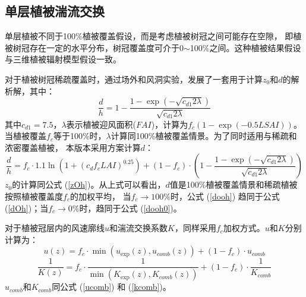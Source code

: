 \subsection{单层植被湍流交换}
单层植被不同于100\%植被覆盖假设，而是考虑植被树冠之间可能存在空隙，
即植被树冠存在一定的水平分布，树冠覆盖度可介于0$\sim$100\%之间。这种植被结果假设与三维植被辐射模型假设一致。


对于植被树冠稀疏覆盖时，\citet{raupach1992drag,raupach1994simplified}通过场外和风洞实验，发展了一套用于计算$z_0$和$d$的解析解，其中：
\begin{equation}\label{dooh0}
\frac{d}{h}=1-\frac{1-\exp \left(-\sqrt{c_{d1} 2 \lambda}\right)}{\sqrt{c_{d1} 2 \lambda}}
\end{equation}
其中$c_{d1}=7.5$，$\lambda$表示植被迎风面积($FAI$)，计算为$f_c\left(1-\exp{\left(-0.5LSAI\right)}\right)$。
当植被覆盖$f_c$等于100\%时，$\lambda$计算同100\%植被覆盖情景。为了同时适用与稀疏和浓密覆盖植被，
本版本采用\citet{dai2019different}方案计算$d$：
\begin{equation}\label{dooh}
\frac{d}{h}=f_{c} \cdot 1.1 \ln \left(1+\left(c_{d} f_{c} LAI\right)^{0.25}\right)+\left(1-f_{c}\right) \cdot\left(1-\frac{1-\exp \left(-\sqrt{c_{d1} 2 \lambda}\right)}{\sqrt{c_{d1} 2 \lambda}}\right)
\end{equation}
$z_0$的计算同公式 (\ref{zOh})。从上式可以看出，$d$值是100\%植被覆盖情景和稀疏植被按照植被覆盖度$f_c$的加权平均，
当$f_c\rightarrow100\%$时，公式 (\ref{dooh}) 趋同于公式 (\ref{dOh})；当$f_c\rightarrow0\%$时，趋同于公式 (\ref{dooh0})。


对于植被冠层内的风速廓线$u$和湍流交换系数$K$，同样采用$f_c$加权方式。$u$和$K$分别计算为：
\begin{equation}
u(z)=f_{c} \cdot \min \left(u_{\exp }(z), u_{comb}(z)\right)+\left(1-f_{c}\right) \cdot u_{comb}
\end{equation}
\begin{equation}
\frac{1}{K(z)}=f_{c} \cdot \frac{1}{\min \left(K_{\exp}(z), K_{comb}(z)\right)}+\left(1-f_{c}\right) \cdot \frac{1}{K_{comb}}
\end{equation}
$u_{comb}$和$K_{comb}$同公式 (\ref{ucomb}) 和 (\ref{kcomb})。
